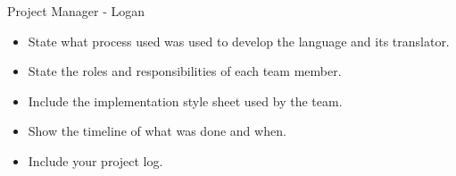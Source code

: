 Project Manager - Logan
\begin{itemize}
\item State what process used was used to develop the language and its translator.
\item State the roles and responsibilities of each team member.
\item Include the implementation style sheet used by the team.
\item Show the timeline of what was done and when.
\item Include your project log.
\end{itemize}